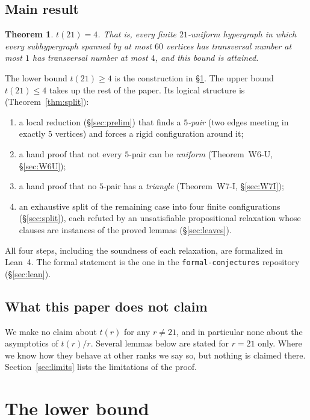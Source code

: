 \documentclass[11pt]{amsart}
\newtheorem{theorem}{Theorem}[section]
\theoremstyle{definition}
\begin{document}
\subsection{Main result}
\begin{theorem}\label{thm:main}
$t(21)=4$. That is, every finite $21$-uniform hypergraph in which every subhypergraph spanned by at most $60$ vertices has transversal number at most $1$ has transversal number at most $4$, and this bound is attained.
\end{theorem}

The lower bound $t(21)\ge 4$ is the construction in \S\ref{sec:lower}. The upper bound $t(21)\le 4$ takes up the rest of the paper. Its logical structure is (Theorem~\ref{thm:split}):
\begin{enumerate}
\item a local reduction (\S\ref{sec:prelim}) that finds a \emph{$5$-pair} (two edges meeting in exactly $5$ vertices) and forces a rigid configuration around it;
\item a hand proof that not every $5$-pair can be \emph{uniform} (Theorem~W6-U, \S\ref{sec:W6U});
\item a hand proof that no $5$-pair has a \emph{triangle} (Theorem~W7-I, \S\ref{sec:W7I});
\item an exhaustive split of the remaining case into four finite configurations (\S\ref{sec:split}), each refuted by an unsatisfiable propositional relaxation whose clauses are instances of the proved lemmas (\S\ref{sec:leaves}).
\end{enumerate}
All four steps, including the soundness of each relaxation, are formalized in Lean~4. The formal statement is the one in the \texttt{formal-conjectures} repository (\S\ref{sec:lean}).

\subsection{What this paper does not claim}
We make no claim about $t(r)$ for any $r\neq 21$, and in particular none about the asymptotics of $t(r)/r$. Several lemmas below are stated for $r=21$ only. Where we know how they behave at other ranks we say so, but nothing is claimed there. Section~\ref{sec:limits} lists the limitations of the proof.

\section{The lower bound}\label{sec:lower}
\end{document}
